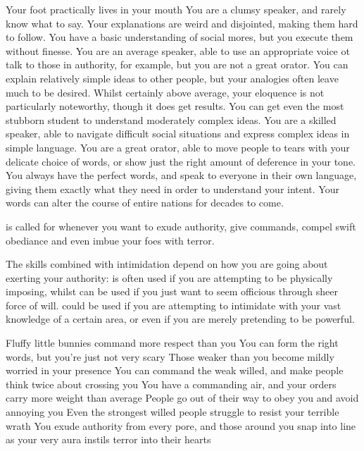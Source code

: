 \ratingTable
{Your foot practically lives in your mouth}
{You are a clumsy speaker, and rarely know what to say. Your explanations are weird and disjointed, making them hard to follow.}
{You have a basic understanding of social mores, but you execute them without finesse. }
{You are an average speaker, able to use an appropriate voice ot talk to those in authority, for example, but you are not a great orator. You can explain relatively simple ideas to other people, but your analogies often leave much to be desired. }
{Whilst certainly above average, your eloquence is not particularly noteworthy, though it does get results. You can get even the most stubborn student to understand moderately complex ideas.}
{You are a skilled speaker, able to navigate difficult social situations and express complex ideas in simple language.}
{You are a great orator, able to move people to tears with your delicate choice of words, or show just the right amount of deference in your tone.}
{You always have the perfect words, and speak to everyone in their own language, giving them exactly what they need in order to understand your intent. Your words can alter the course of entire nations for decades to come.}


 is called for whenever you want to exude authority, give commands, compel swift obediance and even imbue your foes with terror. 

The skills combined with intimidation depend on how you are going about exerting your authority:  is often used if you are attempting to be physically imposing, whilst  can be used if you just want to seem officious through sheer force of will.  could be used if you are attempting to intimidate with your vast knowledge of a certain area, or even  if you are merely pretending to be powerful. 

\ratingTable
{Fluffy little bunnies command more respect than you}
{You can form the right words, but you're just not very scary}
{Those weaker than you become mildly worried in your presence}
{You can command the weak willed, and make people think twice about crossing you}
{You have a commanding air, and your orders carry more weight than average}
{People go out of their way to obey you and avoid annoying you}
{Even the strongest willed people struggle to resist your terrible wrath}
{You exude authority from every pore, and those around you snap into line as your very aura instils terror into their hearts}


